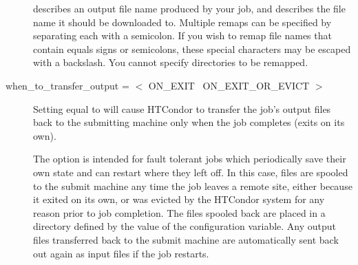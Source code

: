 \begin{description}
 describes an output file name produced by your job, and
 describes the file name it should be downloaded to.
Multiple remaps can be specified by separating each with a semicolon.
If you wish to remap file names that contain equals signs or
semicolons, these special characters may be escaped with a backslash.
You cannot specify directories to be remapped. 



\label{man-condor-submit-when-to-transfer-output}
\item[when\_to\_transfer\_output = $<$ ON\_EXIT \Bar\ ON\_EXIT\_OR\_EVICT $>$] 

Setting  equal to  will
cause HTCondor to transfer the job's output files back to the submitting
machine only when the job completes (exits on its own).

The  option is intended for fault tolerant
jobs which periodically save their own state and can restart where
they left off.
In this case, files are spooled to the submit machine any time the
job leaves a remote site, either because it exited on its own, or was
evicted by the HTCondor system for any reason prior to job completion.
The files spooled back are placed in a directory defined by
the value of the  configuration variable.
Any output files transferred back to the submit machine are
automatically sent back out again as input files if the job restarts.

\end{description} 

